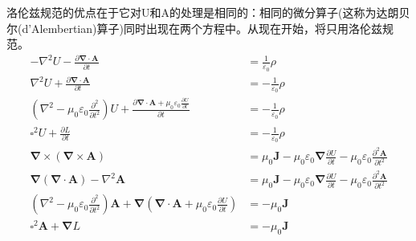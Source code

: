 洛伦兹规范的优点在于它对U和A的处理是相同的：相同的微分算子(这称为达朗贝尔(d'Alembertian)算子)同时出现在两个方程中。从现在开始，将只用洛伦兹规范。
\begin{align*}
    -\nabla^2U-\frac{\partial\boldsymbol{\boldsymbol{\nabla}\cdot A}}{\partial t}&=\frac{1}{\varepsilon_0}\rho\\
    \nabla^2U+\frac{\partial \boldsymbol{\nabla}\cdot\boldsymbol{A}}{\partial t}&=-\frac{1}{\varepsilon_0}\rho\\
    \left(\nabla^2-\mu_0\varepsilon_0\frac{\partial^2}{\partial t^2}\right)U+\frac{\partial \boldsymbol{\nabla}\cdot\boldsymbol{A}+\mu_0\varepsilon_0\frac{\partial U}{\partial t}}{\partial t}&=-\frac{1}{\varepsilon_0}\rho\\
    \square^2U+\frac{\partial L}{\partial t}&=-\frac{1}{\varepsilon_0}\rho\\
    \boldsymbol{\nabla}\times\left(\boldsymbol{\nabla}\times\boldsymbol{A}\right)&=\mu_0\boldsymbol{J}
    -\mu_0\varepsilon_0\boldsymbol{\nabla}\frac{\partial U}{\partial t}
    -\mu_0\varepsilon_0\frac{\partial^2\boldsymbol{A}}{\partial t^2}\\
    \boldsymbol{\nabla}\left(\boldsymbol{\nabla}\cdot\boldsymbol{A}\right)
    -\nabla^2\boldsymbol{A}&=\mu_0\boldsymbol{J}
    -\mu_0\varepsilon_0\boldsymbol{\nabla}\frac{\partial U}{\partial t}
    -\mu_0\varepsilon_0\frac{\partial^2\boldsymbol{A}}{\partial t^2}\\
    \left(\nabla^2-\mu_0\varepsilon_0\frac{\partial^2}{\partial t^2}\right)\boldsymbol{A}+\boldsymbol{\nabla}\left(\boldsymbol{\nabla}\cdot\boldsymbol{A}+\mu_0\varepsilon_0\frac{\partial U}{\partial t}\right)&=-\mu_0\boldsymbol{J}\\
    \square^2\boldsymbol{A}+\boldsymbol{\nabla}L&=-\mu_0\boldsymbol{J}
\end{align*}
